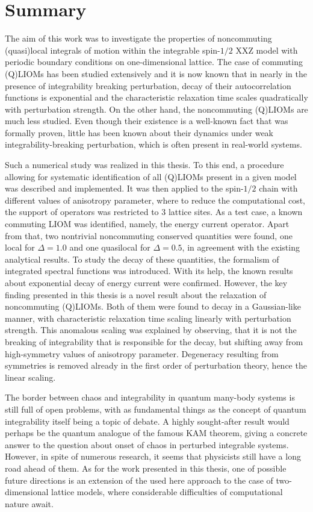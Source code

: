 \chapter{Summary}
\thispagestyle{chapterBeginStyle}
The aim of this work was to investigate the properties of noncommuting (quasi)local integrals of
motion within the integrable spin-\(1/2\) XXZ model with periodic boundary conditions
on one-dimensional lattice. The case of commuting (Q)LIOMs has been studied extensively
and it is now known that in nearly in the presence of integrability breaking perturbation, 
decay of their autocorrelation functions is exponential and the characteristic relaxation
time scales quadratically with perturbation strength. On the other hand, the noncommuting
(Q)LIOMs are much less studied. Even though their existence is a well-known fact that was
formally proven,  little has been known about their dynamics under weak integrability-breaking
perturbation, which is often present in real-world systems.

Such a numerical study was realized in this thesis. To this end, a procedure allowing for 
systematic identification of all (Q)LIOMs present in a given model was described and implemented.
It was then applied to the spin-\(1/2\) chain with different values of anisotropy parameter,
where to reduce the computational cost, the support of operators was restricted to \(3\) lattice sites.
As a test case, a known commuting LIOM was identified, namely, the energy current operator.
Apart from that, two nontrivial noncommuting conserved  quantities were found, one local for
\(\Delta = 1.0\) and one quasilocal for \(\Delta=0.5\), in agreement with the existing analytical
results. To study the decay of these quantities, the formalism of integrated spectral
functions was introduced. With its help, the known results about exponential
decay of energy current were confirmed. However, the key finding presented in this thesis 
is a novel result about the relaxation of noncommuting (Q)LIOMs. Both of them were found
to decay in a Gaussian-like manner, with characteristic relaxation time scaling linearly
with perturbation strength. This anomalous scaling was explained by observing, that
it is not the breaking of integrability that is responsible for the decay, but shifting
away from high-symmetry values of anisotropy parameter. Degeneracy resulting from
symmetries is removed already in the first order of perturbation theory, hence the linear scaling.

The border between chaos and integrability in quantum many-body systems is still full
of open problems, with as fundamental things as the concept of quantum integrability itself
being a topic of debate. A highly sought-after result would perhaps be the quantum analogue
of the famous KAM theorem, giving a concrete answer to the question about onset of chaos
in perturbed integrable systems. However, in spite of numerous research, it seems that
physicists still have a long road ahead of them. As for the work presented in this thesis,
one of possible future directions is an extension of the used here approach to the
case of two-dimensional lattice models, where considerable difficulties of computational
nature await.